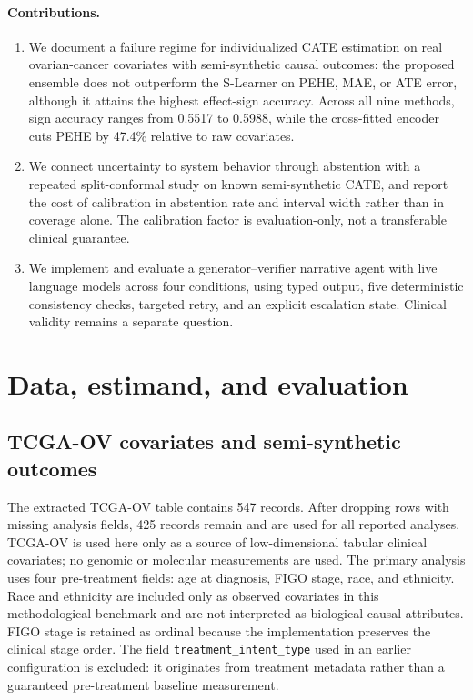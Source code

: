 \documentclass{article}
\begin{document}
\paragraph{Contributions.}
\begin{enumerate}
\item We document a failure regime for individualized CATE estimation on real ovarian-cancer covariates with semi-synthetic causal outcomes: the proposed ensemble does not outperform the S-Learner on PEHE, MAE, or ATE error, although it attains the highest effect-sign accuracy. Across all nine methods, sign accuracy ranges from 0.5517 to 0.5988, while the cross-fitted encoder cuts PEHE by 47.4\% relative to raw covariates.
\item We connect uncertainty to system behavior through abstention with a repeated split-conformal study on known semi-synthetic CATE, and report the cost of calibration in abstention rate and interval width rather than in coverage alone. The calibration factor is evaluation-only, not a transferable clinical guarantee.
\item We implement and evaluate a generator--verifier narrative agent with live language models across four conditions, using typed output, five deterministic consistency checks, targeted retry, and an explicit escalation state. Clinical validity remains a separate question.
\end{enumerate}

\section{Data, estimand, and evaluation}
\subsection{TCGA-OV covariates and semi-synthetic outcomes}
The extracted TCGA-OV table contains 547 records. After dropping rows with missing analysis fields, 425 records remain and are used for all reported analyses. TCGA-OV is used here only as a source of low-dimensional tabular clinical covariates; no genomic or molecular measurements are used. The primary analysis uses four pre-treatment fields: age at diagnosis, FIGO stage, race, and ethnicity. Race and ethnicity are included only as observed covariates in this methodological benchmark and are not interpreted as biological causal attributes. FIGO stage is retained as ordinal because the implementation preserves the clinical stage order. The field \texttt{treatment\_intent\_type} used in an earlier configuration is excluded: it originates from treatment metadata rather than a guaranteed pre-treatment baseline measurement.
\end{document}
